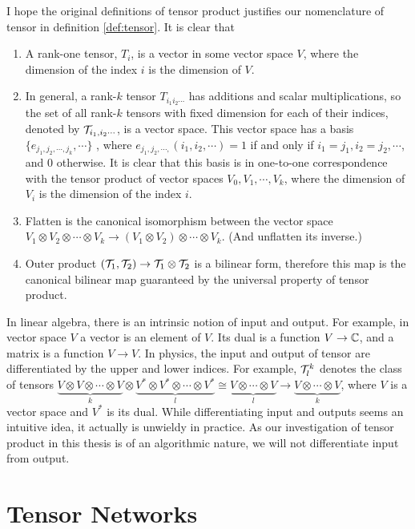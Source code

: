 I hope the original definitions of tensor product justifies our nomenclature of tensor in definition \ref{def:tensor}.
It is clear that 
\begin{enumerate}
	\item A rank-one tensor, $T_i$, is a vector in some vector space $V$,
		where the dimension of the index $i$ is the dimension of $V$.
	\item In general, a rank-$k$ tensor $T_{i_1 i_2 \cdots}$ has additions and scalar multiplications, so the set of all rank-$k$ tensors with fixed dimension for each of their indices, denoted by $\mathcal{T}_{i_1, i_2 \cdots}$, is a vector space.
	This vector space has a basis $\{e_{j_1, j_2, \cdots, j_k}, \cdots\}$ , where $e_{j_1, j_2, \cdots,}(i_1, i_2, \cdots) = 1$ if and only if $i_1 = j_1, i_2 = j_2, \cdots$, and $0$ otherwise.
	It is clear that this basis is in one-to-one correspondence with the tensor product of vector spaces $V_0, V_1, \cdots, V_k$, where the dimension of $V_i$ is the dimension of the index $i$.
	\item Flatten is the canonical isomorphism between the vector space $V_1 \otimes V_2 \otimes \cdots \otimes V_k \rightarrow (V_1 \otimes V_2) \otimes \cdots \otimes V_k$. (And unflatten its inverse.)
	\item Outer product $(\mathcal{T}_1, \mathcal{T}_2) \rightarrow \mathcal{T}_1 \otimes \mathcal{T}_2$ is a bilinear form, therefore this map is the canonical bilinear map guaranteed by the universal property of tensor product.
\end{enumerate}

In linear algebra, there is an intrinsic notion of input and output. 
For example, in vector space $V$ a vector is an element of $V$. Its dual is a function $V \rightarrow \mathbb{C}$, and a matrix is a function $V \rightarrow V$.
In physics, the input and output of tensor are differentiated by the upper and lower indices. 
For example, $\mathcal{T}^k_l$ denotes the class of tensors $ \underbrace{V \otimes V \otimes \cdots \otimes V}_{k} \otimes \underbrace{V^* \otimes V^* \otimes \cdots \otimes V^*}_{l} \cong \underbrace{V \otimes \cdots \otimes V}_{l} \rightarrow \underbrace{V \otimes \cdots \otimes V}_{k}$,
where $V$ is a vector space and $V^*$ is its dual.
While differentiating input and outputs seems an intuitive idea, it actually is unwieldy in practice.
As our investigation of tensor product in this thesis is of an algorithmic nature, we will not differentiate input from output.

\section{Tensor Networks}

